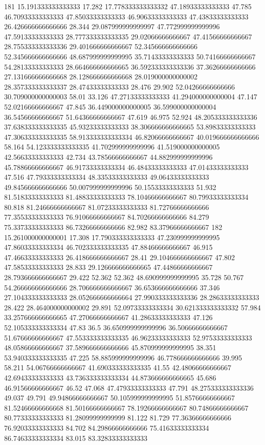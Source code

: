 181 15.191333333333333 17.282 17.778333333333332 47.18933333333333 47.785 46.70933333333333 47.85033333333333 46.90633333333333 47.43833333333333 26.426666666666666 28.344 29.087999999999997 47.772999999999996 47.59133333333333 28.777333333333335 29.02066666666667 47.41566666666667 28.755333333333336 29.401666666666667 52.345666666666666 52.345666666666666 48.687999999999995 35.71433333333333 50.74166666666667 54.28133333333333 28.664666666666665 36.592333333333336 37.36266666666666 27.131666666666668 28.128666666666668 28.019000000000002 28.357333333333337 28.47433333333333 28.476 29.902 52.04266666666666 30.709000000000003 58.01 33.126 47.27133333333333 41.294000000000004 47.147 52.02166666666667 47.845 36.449000000000005 36.599000000000004 36.54566666666667 51.64366666666667 47.619 46.975 52.924 48.205333333333336 37.638333333333335 45.93233333333333 38.306666666666665 53.89833333333333 47.306333333333335 58.913333333333334 46.82066666666667 40.019666666666666 58.164 54.123333333333335 41.702999999999996 41.519000000000005 42.56633333333333 42.734 43.78566666666667 44.882999999999996 45.78866666666667 46.91733333333334 46.48433333333333 47.01433333333333 47.516 47.79333333333334 48.33533333333333 49.06433333333333 49.845666666666666 50.007999999999996 50.15533333333333 51.932 81.51833333333333 81.48833333333333 78.10466666666667 80.79933333333334 80.818 81.24666666666667 81.07233333333333 81.72766666666666 77.35533333333333 76.91066666666667 84.70266666666666 84.279 75.33733333333333 86.73266666666666 82.982 83.37966666666667
182 15.261000000000001 17.308 17.790333333333333 47.230999999999995 47.86033333333334 46.702333333333335 47.88466666666667 46.915 47.46633333333333 26.418666666666667 28.41 29.104666666666667 47.802 47.58533333333333 28.833 29.126666666666665 47.44866666666667 28.793666666666667 29.422 52.362 52.362 48.690999999999995 35.728 50.767 54.266666666666666 28.706666666666667 36.653666666666666 37.346 27.104333333333333 28.052666666666664 27.990333333333336 28.28633333333333 28.422 28.464000000000002 29.891 52.09733333333334 30.621333333333332 57.984 33.257666666666665 47.27066666666667 41.28633333333333 47.126 52.105333333333334 47.83 36.5 36.650999999999996 36.50666666666667 51.67666666666667 47.553333333333335 46.96233333333333 52.97533333333333 48.05866666666667 37.589666666666666 45.870999999999995 38.351 53.940333333333335 47.225 58.885999999999996 46.778666666666666 39.995 58.211 54.06766666666667 41.690333333333335 41.55 42.48066666666667 42.69433333333333 43.736333333333334 44.873666666666665 45.686 46.91566666666667 46.52 47.068 47.47933333333333 47.791 48.275333333333336 49.037 49.791 49.94866666666667 50.105999999999995 51.85766666666667 81.52466666666668 81.50166666666667 78.19266666666667 80.74866666666667 80.77333333333333 81.28099999999999 81.122 81.729 77.36366666666666 76.92033333333333 84.702 84.29866666666666 75.41633333333334 86.74633333333334 83.015 83.32833333333333
